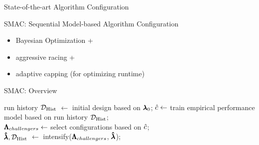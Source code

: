 \begin{frame}[c]{State-of-the-art Algorithm Configuration}

SMAC: Sequential Model-based Algorithm Configuration 

\begin{itemize}
	\item Bayesian Optimization +
	\item aggressive racing +
	\item adaptive capping (for optimizing runtime)
\end{itemize}

\end{frame}
\begin{frame}[c]{SMAC: Overview }

\LinesNotNumbered
\begin{algorithm}[H]
\BlankLine
run history $\mathcal{D}_{\text{Hist}}$ $\leftarrow$ initial design based on $\pmb{\lambda}_0$; 
 {
	\pause
	$\hat{c} \leftarrow$ train empirical performance model based on run history $\mathcal{D}_{\text{Hist}}$;\\
	\pause
	$\pmb{\Lambda}_{challengers} \leftarrow$ select configurations based on $\hat{c}$;\\
	\pause
	$\pmb{\hat{\lambda}}, \mathcal{D}_{\text{Hist}}$  $\leftarrow$ intensify($\pmb{\Lambda}_{challengers}$, $\finconf$); 
}
\pause
\Return{$\finconf$}
\caption{SMAC}
\end{algorithm}

\end{frame}

